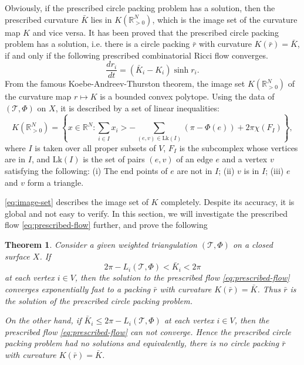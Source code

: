 \documentclass[12pt]{amsart}
\numberwithin{equation}{section}
\newtheorem{theo}[prop]{Theorem}
\begin{document}
Obviously, if the prescribed circle packing problem has a solution, then the prescribed curvature $\bar{K}$
lies in $K(\mathbb{R}^N_{>0})$, which is the image set of the curvature map $K$ and vice versa. It has been proved \cite{ChowLuo}
that the prescribed circle packing problem has a solution, i.e. there is a circle packing $\bar{r}$ with curvature
$K(\bar{r}) = \bar{K}$, if and only if the following prescribed combinatorial Ricci flow converges.
\begin{equation}\label{eq:prescribed-flow}
\frac{dr_i}{dt} = (\bar{K}_i - K_i) \sinh r_i.
\end{equation}
From the famous Koebe-Andreev-Thurston theorem, the image set $K(\mathbb{R}^N_{>0})$ of the curvature map
$r \mapsto K$ is a bounded convex polytope. Using the data of $(\mathcal{T},\Phi)$ on $X$, it is described by a set of linear
inequalities:
\begin{equation}\label{eq:image-set}
K(\mathbb{R}^N_{>0}) = \left\{x \in \mathbb{R}^N : \sum_{i \in I} x_i > -\sum_{(e,v) \in \mathrm{Lk}(I)} (\pi - \Phi(e)) + 2\pi\chi(F_I)\right\},
\end{equation}
where $I$ is taken over all proper subsets of $V$, $F_I$ is the subcomplex whose vertices are in $I$, and $\mathrm{Lk}(I)$ is
the set of pairs $(e,v)$ of an edge $e$ and a vertex $v$ satisfying the following: (i) The end points of $e$ are not
in $I$; (ii) $v$ is in $I$; (iii) $e$ and $v$ form a triangle.

\eqref{eq:image-set} describes the image set of $K$ completely. Despite its accuracy, it is global and not easy to verify.
In this section, we will investigate the prescribed flow \eqref{eq:prescribed-flow} further, and prove the following

\begin{theo}\label{thm:8.1}
Consider a given weighted triangulation $(\mathcal{T},\Phi)$ on a closed surface $X$. If
\[
2\pi - L_i(\mathcal{T},\Phi) < \bar{K}_i < 2\pi
\]
at each vertex $i \in V$, then the solution to the prescribed flow \eqref{eq:prescribed-flow} converges exponentially fast to a
packing $\bar{r}$ with curvature $K(\bar{r}) = \bar{K}$. Thus $\bar{r}$ is the solution of the prescribed circle packing problem.

On the other hand, if $\bar{K}_i \leq 2\pi - L_i(\mathcal{T},\Phi)$ at each vertex $i \in V$, then the prescribed flow \eqref{eq:prescribed-flow} can not
converge. Hence the prescribed circle packing problem had no solutions and equivalently, there is no circle
packing $\bar{r}$ with curvature $K(\bar{r}) = \bar{K}$.
\end{theo}
\end{document}

